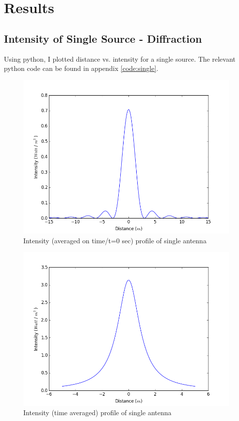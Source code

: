 \chapter{Results}

\section{Intensity of Single Source - Diffraction}

Using python, I plotted distance vs. intensity for a single source. The relevant python code can be found in appendix \ref{code:single}.

\begin{figure}[!h]
\centering	
\includegraphics[scale=0.45]{figure_1.png}
\caption{Intensity (averaged on time/t=0 sec) profile of single antenna}
\end{figure}

\begin{figure}[!h]
\centering	
\includegraphics[scale=0.45]{figure_2.png}
\caption{Intensity (time averaged) profile of single antenna}
\end{figure}

